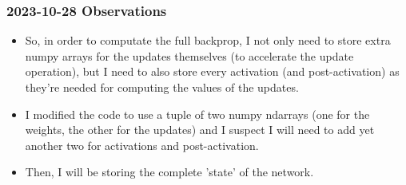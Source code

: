 \documentclass{article}
\begin{document}
\subsubsection{2023-10-28 Observations}
\begin{itemize}
    \item So, in order to computate the full backprop, I not only need to store extra numpy arrays 
    for the updates themselves (to accelerate the update operation), but I need to also store every activation (and post-activation) as they're
    needed for computing the values of the updates.
    \item I modified the code to use a tuple of two numpy ndarrays (one for the weights, the other for the updates)
    and I suspect I will need to add yet another two for activations and post-activation.
    \item Then, I will be storing the complete 'state' of the network.
\end{itemize}
\end{document}
